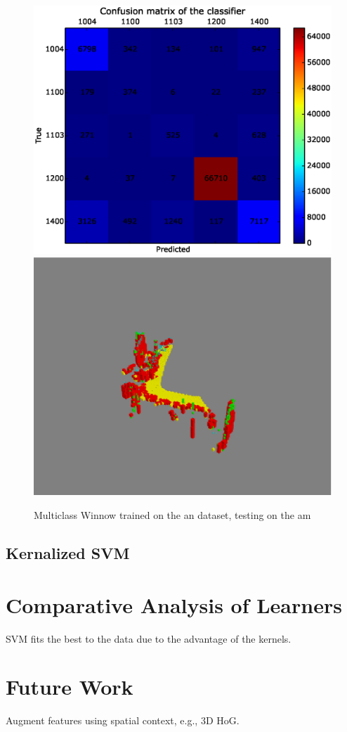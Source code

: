 \documentclass[10pt,a4paper]{article}
\begin{document}
\begin{figure}[htp]
\includegraphics[scale=0.4,trim = 0.3 0.3 0.3 0.3,clip]{figs/winnow_antoam_test1.eps}
\includegraphics[scale=0.4]{figs/winnow_antoam_test1_plot.eps}
\caption{Multiclass Winnow trained on the an dataset, testing on the am}
\label{}
\end{figure}


\subsection{Kernalized SVM}


\section{Comparative Analysis of Learners}
SVM fits the best to the data due to the advantage of the kernels.

\section{Future Work}
Augment features using spatial context, e.g., 3D HoG.\\
\end{document}
